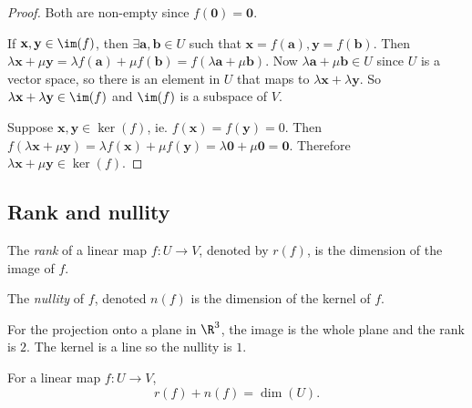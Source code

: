 \documentclass[a4paper]{article}
\begin{document}
\begin{proof}
  Both are non-empty since $f(\mathbf{0}) = \mathbf{0}$.

  If $\mathbf{x, y}\in \im (f)$, then $\exists \mathbf{a, b}\in U$ such that $\mathbf{x} = f(\mathbf{a}), \mathbf{y} = f(\mathbf{b})$. Then $\lambda \mathbf{x} + \mu\mathbf {y} = \lambda f(\mathbf{a}) + \mu f(\mathbf{b}) = f(\lambda\mathbf{a} + \mu\mathbf{b})$. Now $\lambda\mathbf{a} + \mu\mathbf{b}\in U$ since $U$ is a vector space, so there is an element in $U$ that maps to $\lambda\mathbf{x}+ \lambda\mathbf{y}$. So $\lambda\mathbf{x}+ \lambda\mathbf{y}\in \im (f)$ and $\im (f)$ is a subspace of $V$.

  Suppose $\mathbf{x, y}\in \ker(f)$, ie. $f(\mathbf{x}) = f(\mathbf {y}) = 0$. Then $f(\lambda\mathbf{x} + \mu\mathbf{y}) = \lambda f(\mathbf{x}) + \mu f(\mathbf{y}) = \lambda \mathbf{0} + \mu\mathbf{0} = \mathbf{0}$. Therefore $\lambda\mathbf{x}+ \mu\mathbf{y} \in \ker (f)$.
\end{proof}

\subsection{Rank and nullity}
\begin{defi}
  The \emph{rank} of a linear map $f: U\to V$, denoted by $r(f)$, is the dimension of the image of $f$.
\end{defi}

\begin{defi}
  The \emph{nullity} of $f$, denoted $n(f)$ is the dimension of the kernel of $f$.
\end{defi}

\begin{eg}
  For the projection onto a plane in $\R^3$, the image is the whole plane and the rank is $2$. The kernel is a line so the nullity is $1$.
\end{eg}

\begin{thm}
  For a linear map $f: U \to V$,
  \[
    r(f) + n(f) = \dim (U).
  \]
\end{thm}
\end{document}
